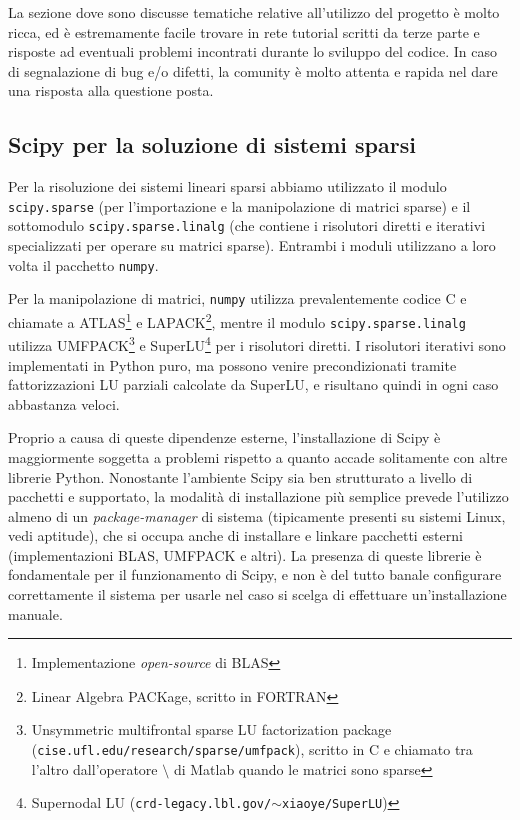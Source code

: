 \documentclass[11pt,a4paper]{scrartcl}
\begin{document}
La sezione dove sono discusse tematiche relative all'utilizzo del progetto è molto ricca, ed è estremamente facile trovare in rete tutorial scritti da terze parte e risposte ad eventuali problemi incontrati durante lo sviluppo del codice. In caso di segnalazione di bug e/o difetti, la comunity è molto attenta e rapida nel dare una risposta alla questione posta. 

%
%

\subsection*{Scipy per la soluzione di sistemi sparsi}

Per la risoluzione dei sistemi lineari sparsi abbiamo utilizzato il modulo \texttt{scipy.sparse} (per l'importazione e la manipolazione di matrici sparse) e il sottomodulo \texttt{scipy.sparse.linalg} (che contiene i risolutori diretti e iterativi specializzati per operare su matrici sparse). Entrambi i moduli utilizzano a loro volta il pacchetto \texttt{numpy}.

Per la manipolazione di matrici, \texttt{numpy} utilizza prevalentemente codice C e chiamate a ATLAS\footnote{Implementazione \emph{open-source} di BLAS} e LAPACK\footnote{Linear Algebra PACKage, scritto in FORTRAN}, mentre il modulo \texttt{scipy.sparse.linalg} utilizza UMFPACK\footnote{Unsymmetric multifrontal sparse LU factorization package (\texttt{cise.ufl.edu/research/sparse/umfpack}), scritto in C e chiamato tra l'altro dall'operatore $\setminus$ di Matlab quando le matrici sono sparse} e SuperLU\footnote{Supernodal LU (\texttt{crd-legacy.lbl.gov/$\sim$xiaoye/SuperLU})} per i risolutori diretti. I risolutori iterativi sono implementati in Python puro, ma possono venire precondizionati tramite fattorizzazioni LU parziali calcolate da SuperLU, e risultano quindi in ogni caso abbastanza veloci.

Proprio a causa di queste dipendenze esterne, l'installazione di Scipy è maggiormente soggetta a problemi rispetto a quanto accade solitamente con altre librerie Python. Nonostante l'ambiente Scipy sia ben strutturato a livello di pacchetti e supportato, la modalità di installazione più semplice prevede l'utilizzo almeno di un \emph{package-manager} di sistema (tipicamente presenti su sistemi Linux, vedi aptitude), che si occupa anche di installare e linkare pacchetti esterni (implementazioni BLAS, UMFPACK e altri). La presenza di queste librerie è fondamentale per il funzionamento di Scipy, e non è del tutto banale configurare correttamente il sistema per usarle nel caso si scelga di effettuare un'installazione manuale.
\end{document}
